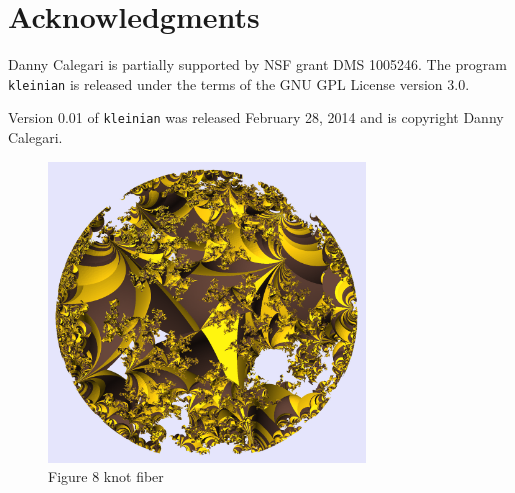 \documentclass[12pt]{article}
\begin{document}
\section{Acknowledgments}
Danny Calegari is partially supported by NSF grant DMS 1005246. The program 
{\tt kleinian} is released under the terms of the GNU GPL License version 3.0.

\medskip

\noindent Version 0.01 of {\tt kleinian} was released February 28, 2014 
and is copyright Danny Calegari.

\begin{figure}[ht]
\centering
\includegraphics[width=0.75\textwidth]{example_pictures/fiber}
\caption{Figure 8
knot fiber}\label{fiber}
\end{figure}
\end{document}
